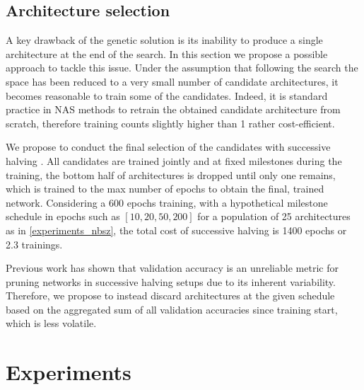 \documentclass[10pt]{article} %
\begin{document}
\subsection{Architecture selection}
\label{method_selection}

A key drawback of the genetic solution is its inability to produce a single architecture at the end of the search. In this section we propose a possible approach to tackle this issue. Under the assumption that following the search the space has been reduced to a very small number of candidate architectures, it becomes reasonable to train some of the candidates. Indeed, it is standard practice in NAS methods to retrain the obtained candidate architecture from scratch, therefore training counts slightly higher than 1 rather cost-efficient. 

We propose to conduct the final selection of the candidates with successive halving \citep{hu2022generalizing, li2018hyperband, jamieson2016non}. All candidates are trained jointly and at fixed milestones during the training, the bottom half of architectures is dropped until only one remains, which is trained to the max number of epochs to obtain the final, trained network. Considering a 600 epochs training, with a hypothetical milestone schedule in epochs such as $[10, 20, 50, 200]$ for a population of 25 architectures as in \ref{experiments_nbsz}, the total cost of successive halving is 1400 epochs or 2.3 trainings.

Previous work \citep{ly2024analyzing} has shown that validation accuracy is an unreliable metric for pruning networks in successive halving setups due to its inherent variability. Therefore, we propose to instead discard architectures at the given schedule based on the aggregated sum of all validation accuracies since training start, which is less volatile.

\section{Experiments}
\label{experiments}
\end{document}
